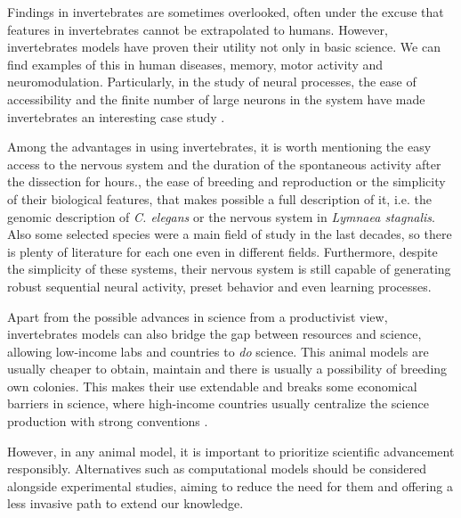 Findings in invertebrates are sometimes overlooked, often under the excuse that features in invertebrates cannot be extrapolated to humans. However, invertebrates models have proven their utility not only in basic science. We can find examples of this in human diseases, memory, motor activity and neuromodulation. Particularly, in the study of neural processes, the ease of accessibility and the finite number of large neurons in the system have made invertebrates an interesting case study \parencite{gelperin_recent_2019}. 

Among the advantages in using invertebrates, it is worth mentioning the easy access to the nervous system and the duration of the spontaneous activity after the dissection for hours., the ease of breeding and reproduction or the simplicity of their biological features, that makes possible a full description of it, i.e. the genomic description of \textit{C. elegans} or the nervous system in \textit{Lymnaea stagnalis}. Also some selected species were a main field of study in the last decades, so there is plenty of literature for each one even in different fields. Furthermore, despite the simplicity of these systems, their nervous system is still capable of generating robust sequential neural activity, preset behavior and even learning processes. 


Apart from the possible advances in science from a productivist view, invertebrates models can also bridge the gap between resources and science, allowing low-income labs and countries to \textit{do} science. This animal models are usually cheaper to obtain, maintain and there is usually a possibility of breeding own colonies. This makes their use extendable and breaks some economical barriers in science, where high-income countries usually centralize the science production with strong conventions \parencite{castillo_spineless_2017,stephan_how_2015}. 


However, in any animal model, it is important to prioritize scientific advancement responsibly. Alternatives such as computational models should be considered alongside experimental studies, aiming to reduce the need for them and offering a less invasive path to extend our knowledge.


